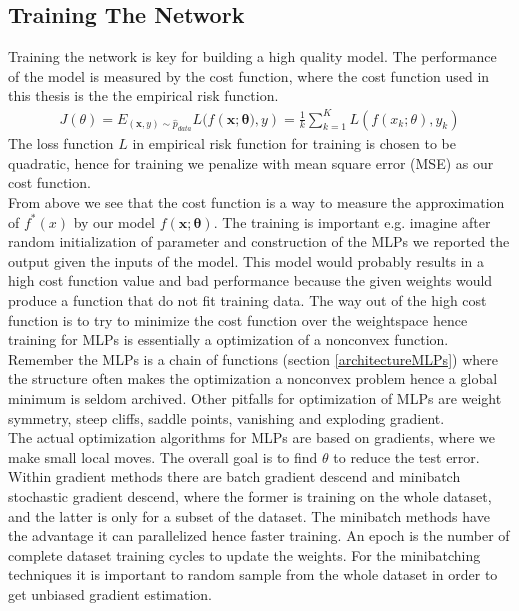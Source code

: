 \subsection{Training The Network}\label{trainNetwork}
Training the network is key for building a high quality model. The performance of the model is measured by the cost function, where the cost function used in this thesis is the the empirical risk function.
\begin{align*}
J(\theta)=E_{(\bm{x},y)\sim \hat{p}_{data}} L(f(\bm{x};\bm{\theta)},y)= \frac{1}{k}\sum_{k=1}^{K} L(f(x_k;\theta),y_k)
\end{align*}
The loss function $L$ in empirical risk function for training is chosen to be quadratic, hence for training we penalize with mean square error (MSE) as our cost function.\\

From above we see that the cost function is a way to measure the approximation of $f^*(x)$ by our model $f(\bm{x};\bm{\theta})$. The training is important e.g. imagine after random initialization of parameter and construction of the MLPs we reported the output given the inputs of the model. This model would probably results in a high cost function value and bad performance because the given weights would produce a function that do not fit training data. The way out of the high cost function is to try to minimize the cost function over the weightspace hence training for MLPs is essentially a optimization of a nonconvex function. Remember the MLPs is a chain of functions (section \ref{architectureMLPs}) where the structure often makes the optimization a nonconvex problem hence a global minimum is seldom archived. Other pitfalls for optimization of MLPs are weight symmetry, steep cliffs, saddle points, vanishing and exploding gradient.\\

The actual optimization algorithms for MLPs are based on gradients, where we make small local moves. The overall goal is to find $\theta$ to reduce the test error. Within gradient methods there are batch gradient descend and minibatch stochastic gradient descend, where the former is training on the whole dataset, and the latter is only for a subset of the dataset. The minibatch methods have the advantage it can parallelized hence faster training. An epoch is the number of complete dataset training cycles to update the weights. For the minibatching techniques it is important to random sample from the whole dataset in order to get unbiased gradient estimation. \\

